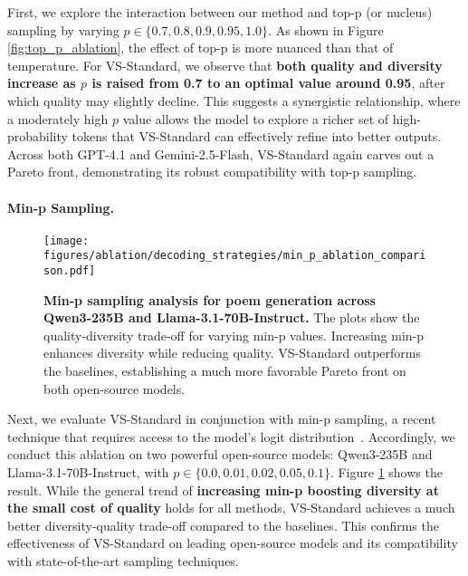 First, we explore the interaction between our method and top-p (or nucleus) sampling by varying $p \in \{0.7, 0.8, 0.9, 0.95, 1.0\}$. As shown in Figure \ref{fig:top_p_ablation}, the effect of top-p is more nuanced than that of temperature. For VS-Standard, we observe that \textbf{both quality and diversity increase as $p$ is raised from 0.7 to an optimal value around 0.95}, after which quality may slightly decline. This suggests a synergistic relationship, where a moderately high $p$ value allows the model to explore a richer set of high-probability tokens that VS-Standard can effectively refine into better outputs. Across both GPT-4.1 and Gemini-2.5-Flash, VS-Standard again carves out a Pareto front, demonstrating its robust compatibility with top-p sampling.

\paragraph{Min-p Sampling.}
\begin{figure}[ht]
    \centering
    \texttt{[image: figures/ablation/decoding\_strategies/min\_p\_ablation\_comparison.pdf]}
    \caption{\textbf{Min-p sampling analysis for poem generation across Qwen3-235B and Llama-3.1-70B-Instruct.} The plots show the quality-diversity trade-off for varying min-p values. Increasing min-p enhances diversity while reducing quality. VS-Standard outperforms the baselines, establishing a much more favorable Pareto front on both open-source models.}
    \label{fig:min_p_ablation}
\end{figure}

Next, we evaluate VS-Standard in conjunction with min-p sampling, a recent technique that requires access to the model's logit distribution~\citep{nguyen_turning_2025}. Accordingly, we conduct this ablation on two powerful open-source models: Qwen3-235B and Llama-3.1-70B-Instruct, with $p \in \{0.0, 0.01, 0.02, 0.05, 0.1\}$. Figure \ref{fig:min_p_ablation} shows the result. While the general trend of \textbf{increasing min-p boosting diversity at the small cost of quality} holds for all methods, VS-Standard achieves a much better diversity-quality trade-off compared to the baselines. %
This confirms the effectiveness of VS-Standard on leading open-source models and its compatibility with state-of-the-art sampling techniques.


